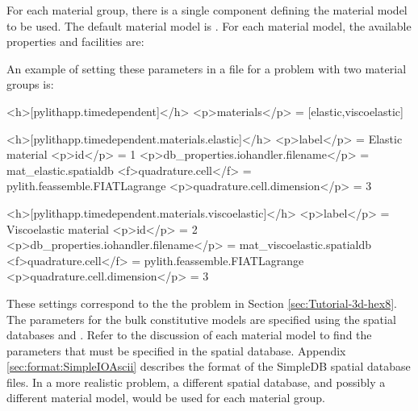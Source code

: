 For each material group, there is a single component defining the
material model to be used. The default material model is .
For each material model, the available properties and facilities are:
\begin{inventory}
\end{inventory}
An example of setting these parameters in a  file for
a problem with two material groups is:
\begin{cfg}
<h>[pylithapp.timedependent]</h>
<p>materials</p> = [elastic,viscoelastic]

<h>[pylithapp.timedependent.materials.elastic]</h>
<p>label</p> = Elastic material
<p>id</p> = 1
<p>db_properties.iohandler.filename</p> = mat\_elastic.spatialdb
<f>quadrature.cell</f> = pylith.feassemble.FIATLagrange
<p>quadrature.cell.dimension</p> = 3

<h>[pylithapp.timedependent.materials.viscoelastic]</h>
<p>label</p> = Viscoelastic material
<p>id</p> = 2
<p>db_properties.iohandler.filename</p> = mat_viscoelastic.spatialdb
<f>quadrature.cell</f> = pylith.feassemble.FIATLagrange
<p>quadrature.cell.dimension</p> = 3
\end{cfg}

These settings correspond to the the problem in Section
\vref{sec:Tutorial-3d-hex8}.  The parameters for the bulk constitutive
models are specified using the spatial databases
 and
.  Refer to the discussion of
each material model to find the parameters that must be specified in
the spatial database. Appendix \vref{sec:format:SimpleIOAscii}
describes the format of the SimpleDB spatial database files. In a more
realistic problem, a different spatial database, and possibly a
different material model, would be used for each material group.


